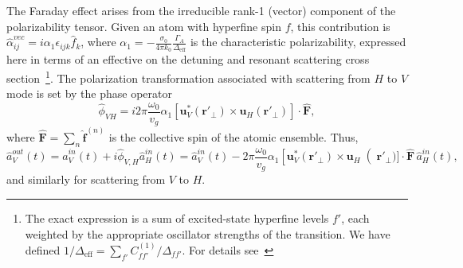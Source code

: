 \documentclass[preprint,aps,pra,onecolumn,superscriptaddress]{revtex4-1} %
\newcommand{\mbf}[1]{\mathbf{#1}}
\newcommand{\eff}{\text{eff}}
\begin{document}
The Faraday effect arises from the irreducible rank-1 (vector) component of the polarizability tensor.  Given an atom with hyperfine spin $f$, this contribution is $\hat{\alpha}^{vec}_{ij} = i \alpha_1 \epsilon_{ijk} \hat{f}_k$, where $\alpha_1 = -\frac{\sigma_0}{4\pi k_0 }\frac{\Gamma_A}{\Delta_{\eff}} $ is the characteristic polarizability, expressed here in terms of an effective on the detuning and resonant scattering cross section~\footnote{The exact expression is a sum of excited-state hyperfine levels $f'$, each weighted by the appropriate oscillator strengths of the transition.  We have defined $1/\Delta_{\eff} = \sum_{f'} C^{(1)}_{ff'}/\Delta_{ff'}$. For details see~\cite{?}}.   The polarization transformation associated with scattering from $H$ to $V$ mode is set by the phase operator
\begin{equation}
\hat{\phi}_{VH} = i 2\pi \frac{\omega_0}{v_g}\alpha_1 \left[ \mbf{u}^*_V (\mbf{r}'_\perp) \times  \mbf{u}_{H} (\mbf{r}'_\perp) \right] \cdot \hat{\mbf{F}},
\end{equation}
where $\hat{\mbf{F}}=\sum_n \hat{\mbf{f}}^{(n)}$ is the collective spin of the atomic ensemble.  Thus,
\begin{equation}
\hat{a}^{out}_V(t) = \hat{a}^{in}_V(t)  +i  \hat{\phi}_{V,H} \hat{a}^{in}_{H}(t)= \hat{a}^{in}_V(t)  - 2\pi \frac{\omega_0}{v_g}\alpha_1 \left[ \mbf{u}^*_V (\mbf{r}'_\perp) \times  \mbf{u}_{H}\right(\mbf{r}'_\perp)]  \cdot \hat{\mbf{F}}\, \hat{a}^{in}_{H}(t),
\end{equation}
 and similarly for scattering from $V$ to $H$.
\end{document}
